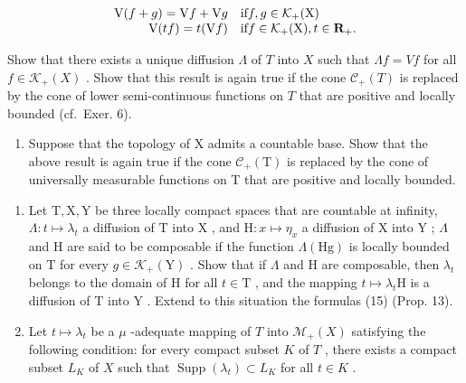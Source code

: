 \[
\begin{array}{r l} \mathrm{V} (f + g) = \mathrm{V} f + \mathrm{V} g & \text {if} f, g \in \mathcal {K} _ {+} (\mathrm{X}) \\ \mathrm{V} (t f) = t (\mathrm{V} f) & \text {if} f \in \mathcal {K} _ {+} (\mathrm{X}), t \in \mathbf {R} _ {+}. \end{array}
\]

Show that there exists a unique diffusion \(\Lambda\) of \(T\) into \(X\) such that \(\Lambda f = Vf\) for all \(f \in \mathcal{K}_{+}(X)\) . Show that this result is again true if the cone \(\mathcal{C}_{+}(T)\) is replaced by the cone of lower semi-continuous functions on \(T\) that are positive and locally bounded (cf.~Exer. 6).

\begin{enumerate}
\def\labelenumi{\alph{enumi})}
\setcounter{enumi}{1}
\tightlist
\item
  Suppose that the topology of X admits a countable base. Show that the above result is again true if the cone \(\mathcal{C}_{+}(\mathrm{T})\) is replaced by the cone of universally measurable functions on T that are positive and locally bounded.
\end{enumerate}

\begin{enumerate}
\def\labelenumi{\arabic{enumi})}
\setcounter{enumi}{9}
\item
  Let \(\mathrm{T}, \mathrm{X}, \mathrm{Y}\) be three locally compact spaces that are countable at infinity, \(\Lambda : t \mapsto \lambda_t\) a diffusion of \(\mathrm{T}\) into \(\mathrm{X}\) , and \(\mathrm{H}: x \mapsto \eta_x\) a diffusion of \(\mathrm{X}\) into \(\mathrm{Y}\) ; \(\Lambda\) and \(\mathrm{H}\) are said to be composable if the function \(\Lambda(\mathrm{Hg})\) is locally bounded on \(\mathrm{T}\) for every \(g \in \mathcal{K}_+(\mathrm{Y})\) . Show that if \(\Lambda\) and \(\mathrm{H}\) are composable, then \(\lambda_t\) belongs to the domain of \(\mathrm{H}\) for all \(t \in \mathrm{T}\) , and the mapping \(t \mapsto \lambda_t\mathrm{H}\) is a diffusion of \(\mathrm{T}\) into \(\mathrm{Y}\) . Extend to this situation the formulas (15) (Prop. 13).
\item
  Let \(t \mapsto \lambda_t\) be a \(\mu\) -adequate mapping of \(T\) into \(\mathcal{M}_+(X)\) satisfying the following condition: for every compact subset \(K\) of \(T\) , there exists a compact subset \(L_K\) of \(X\) such that \(\operatorname{Supp}(\lambda_t) \subset L_K\) for all \(t \in K\) .
\end{enumerate}

